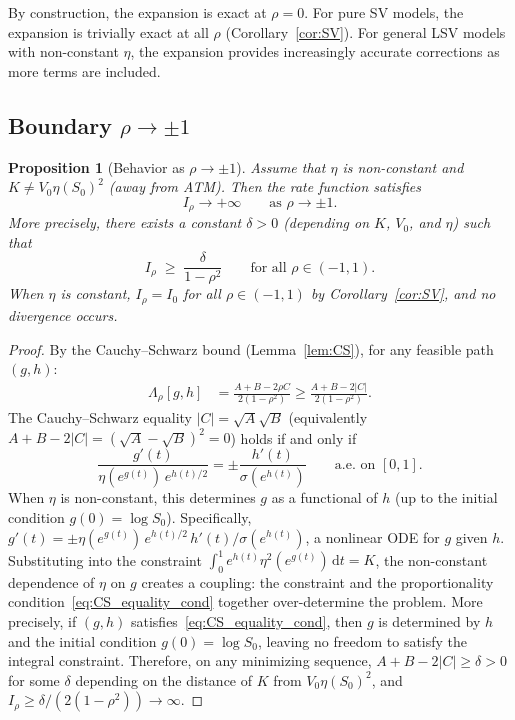 \documentclass[11pt]{article}
\newtheorem{proposition}[theorem]{Proposition}
\theoremstyle{definition}
\newcommand{\dd}{\mathrm{d}}
\begin{document}
By construction, the expansion is exact at $\rho = 0$. For pure SV models, the expansion is trivially exact at all $\rho$ (Corollary~\ref{cor:SV}). For general LSV models with non-constant $\eta$, the expansion provides increasingly accurate corrections as more terms are included.

\subsection{Boundary $\rho \to \pm 1$}\label{sec:rho_to_1}

\begin{proposition}[Behavior as $\rho \to \pm 1$]\label{prop:rho_to_1}
Assume that $\eta$ is non-constant and $K \neq V_0\eta(S_0)^2$ (away from ATM). Then the rate function satisfies
\begin{equation}\label{eq:rho_to_1}
  I_\rho \to +\infty \qquad \text{as } \rho \to \pm 1.
\end{equation}
More precisely, there exists a constant $\delta > 0$ (depending on $K$, $V_0$, and $\eta$) such that
\begin{equation}
  I_\rho \;\geq\; \frac{\delta}{1 - \rho^2} \qquad \text{for all } \rho \in (-1,1).
\end{equation}
When $\eta$ is constant, $I_\rho = I_0$ for all $\rho \in (-1,1)$ by Corollary~\ref{cor:SV}, and no divergence occurs.
\end{proposition}

\begin{proof}
By the Cauchy--Schwarz bound (Lemma~\ref{lem:CS}), for any feasible path $(g,h)$:
\begin{align}
  \Lambda_\rho[g,h] &= \frac{A + B - 2\rho C}{2(1-\rho^2)} \geq \frac{A + B - 2|C|}{2(1-\rho^2)}.
\end{align}
The Cauchy--Schwarz equality $|C| = \sqrt{A}\sqrt{B}$ (equivalently $A + B - 2|C| = (\sqrt{A} - \sqrt{B})^2 = 0$) holds if and only if
\begin{equation}\label{eq:CS_equality_cond}
  \frac{g'(t)}{\eta(e^{g(t)})\,e^{h(t)/2}} = \pm\frac{h'(t)}{\sigma(e^{h(t)})} \qquad \text{a.e.\ on } [0,1].
\end{equation}
When $\eta$ is non-constant, this determines $g$ as a functional of $h$ (up to the initial condition $g(0) = \log S_0$). Specifically, $g'(t) = \pm\eta(e^{g(t)})\,e^{h(t)/2}\,h'(t)/\sigma(e^{h(t)})$, a nonlinear ODE for $g$ given $h$. Substituting into the constraint $\int_0^1 e^{h(t)}\eta^2(e^{g(t)})\,\dd t = K$, the non-constant dependence of $\eta$ on $g$ creates a coupling: the constraint and the proportionality condition~\eqref{eq:CS_equality_cond} together over-determine the problem. More precisely, if $(g,h)$ satisfies~\eqref{eq:CS_equality_cond}, then $g$ is determined by $h$ and the initial condition $g(0) = \log S_0$, leaving no freedom to satisfy the integral constraint. Therefore, on any minimizing sequence, $A + B - 2|C| \geq \delta > 0$ for some $\delta$ depending on the distance of $K$ from $V_0\eta(S_0)^2$, and $I_\rho \geq \delta/(2(1-\rho^2)) \to \infty$.
\end{proof}
\end{document}
